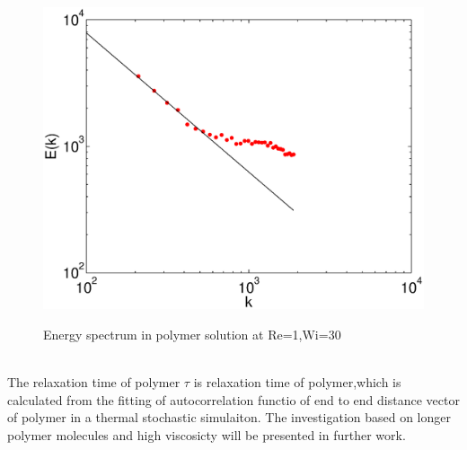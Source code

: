 \documentclass[aps,prl,twocolumn,showpacs,superscriptaddress,groupedaddress]{revtex4}  %
\begin{document}
\begin{figure}
 \includegraphics[scale=0.5]{spepols}
\label{fig:spepols}
\caption{Energy spectrum in polymer solution at Re=1,Wi=30}
\end{figure}\\
The relaxation time of polymer 
 $\tau$ is relaxation time of polymer,which is 
calculated from the fitting of autocorrelation functio of end to end distance vector of polymer in a thermal stochastic simulaiton.
The investigation based on longer polymer molecules and high viscosicty will be presented in further work.


\end{document}
